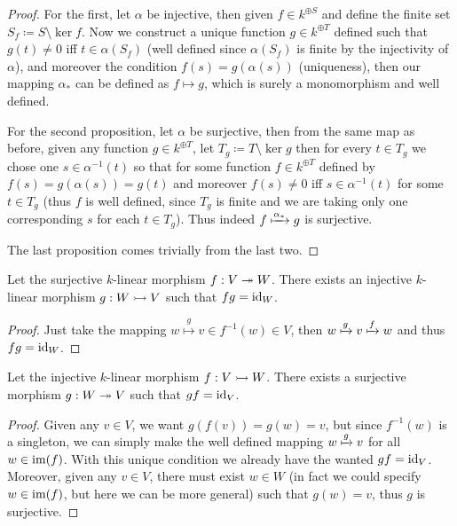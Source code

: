 \begin{proof}
For the first, let \(\alpha\) be injective, then given \(f \in k^{\oplus S}\)
and define the finite set \(S_f \coloneq S \setminus \ker f\). Now we construct a
unique function \(g \in k^{\oplus T}\) defined such that \(g(t) \neq 0\) iff
\(t \in \alpha(S_f)\) (well defined since \(\alpha(S_f)\) is finite by the
injectivity of \(\alpha\)), and moreover the condition \(f(s) =
g(\alpha(s))\) (uniqueness), then our mapping \(\alpha_{\ast}\) can be
defined as \(f \mapsto g\), which is surely a monomorphism and well defined.

For the second proposition, let \(\alpha\) be surjective, then from the same
map as before, given any function \(g \in k^{\oplus T}\), let  \(T_g \coloneq T
\setminus \ker g\) then for every \(t \in T_g\) we chose one \(s \in
\alpha^{-1}(t)\) so that for some function \(f \in k^{\oplus T}\) defined by
\(f(s) = g(\alpha(s)) = g(t)\) and moreover \(f(s) \neq 0\) iff \(s \in
\alpha^{-1}(t)\) for some \(t \in T_g\) (thus \(f\) is well defined, since
\(T_g\) is finite and we are taking only one corresponding \(s\) for each \(t
\in T_g\)). Thus indeed \(f \xmapsto{\alpha_\ast} g\) is surjective.

The last proposition comes trivially from the last two.
\end{proof}

\begin{proposition}
Let the surjective \(k\)-linear morphism \(f: V \twoheadrightarrow W\). There
exists an injective \(k\)-linear morphism \(g: W \rightarrowtail V\) such
that \(f  g = \operatorname{id}_{W}\).
\end{proposition}

\begin{proof}
Just take the mapping \(w \overset g \longmapsto v \in f^{-1}(w) \in V\), then
\(w \xmapsto g v \xmapsto f w\) and thus \(f  g = \operatorname{id}_W\).
\end{proof}

\begin{proposition}
Let the injective \(k\)-linear morphism \(f: V \rightarrowtail W\). There
exists a surjective morphism \(g : W \twoheadrightarrow V\) such that \(g
  f = \operatorname{id}_V\).
\end{proposition}

\begin{proof}
Given any \(v \in V\), we want \(g(f(v)) = g(w) = v\), but since \(f^{-1}(w)\)
is a singleton, we can simply make the well defined mapping \(w \xmapsto g v\)
for all \(w \in \operatorname{im}(f)\). With this unique condition we already have the
wanted \(g  f = \operatorname{id}_V\). Moreover, given any \(v \in V\), there must
exist \(w \in W\) (in fact we could specify \(w \in \operatorname{im}(f)\), but here we can
be more general) such that \(g(w) = v\), thus \(g\) is surjective.
\end{proof}

